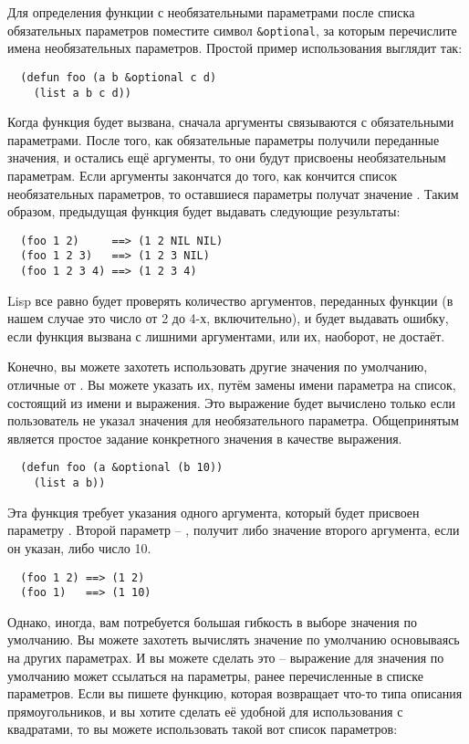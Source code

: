 Для определения функции с необязательными параметрами после списка обязательных параметров
поместите символ \lstinline!&optional!, за которым перечислите имена необязательных
параметров.  Простой пример использования выглядит так:

\begin{lstlisting}
  (defun foo (a b &optional c d) 
    (list a b c d))
\end{lstlisting}

Когда функция будет вызвана, сначала аргументы связываются с обязательными параметрами.
После того, как обязательные параметры получили переданные значения, и остались ещё
аргументы, то они будут присвоены необязательным параметрам.  Если аргументы закончатся до
того, как кончится список необязательных параметров, то оставшиеся параметры получат
значение .  Таким образом, предыдущая функция будет выдавать следующие
результаты:

\begin{verbatim}
  (foo 1 2)     ==> (1 2 NIL NIL)
  (foo 1 2 3)   ==> (1 2 3 NIL)
  (foo 1 2 3 4) ==> (1 2 3 4)
\end{verbatim}

Lisp все равно будет проверять количество аргументов, переданных функции (в нашем случае
это число от 2 до 4-х, включительно), и будет выдавать ошибку, если функция вызвана с
лишними аргументами, или их, наоборот, не достаёт.

Конечно, вы можете захотеть использовать другие значения по умолчанию, отличные от
.  Вы можете указать их, путём замены имени параметра на список, состоящий из
имени и выражения.  Это выражение будет вычислено только если пользователь не указал
значения для необязательного параметра.  Общепринятым является простое задание конкретного
значения в качестве выражения.

\begin{lstlisting}
  (defun foo (a &optional (b 10)) 
    (list a b))
\end{lstlisting}

Эта функция требует указания одного аргумента, который будет присвоен параметру .
Второй параметр -- , получит либо значение второго аргумента, если он указан, либо
число 10.

\begin{verbatim}
  (foo 1 2) ==> (1 2)
  (foo 1)   ==> (1 10)
\end{verbatim}

Однако, иногда, вам потребуется большая гибкость в выборе значения по умолчанию.  Вы
можете захотеть вычислять значение по умолчанию основываясь на других параметрах.  И вы
можете сделать это -- выражение для значения по умолчанию может ссылаться на параметры,
ранее перечисленные в списке параметров.  Если вы пишете функцию, которая возвращает
что-то типа описания прямоугольников, и вы хотите сделать её удобной для использования с
квадратами, то вы можете использовать такой вот список параметров:

